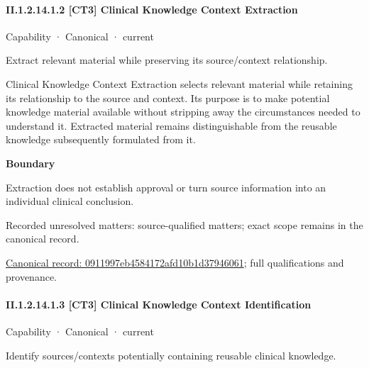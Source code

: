 \paragraph*{II.1.2.14.1.2 [CT3] Clinical Knowledge Context Extraction}
\label{navigation:II.1.2.14.1.2}

\label{element:0911997eb4584172afd10b1d37946061}
{\small Capability · Canonical · current}\par

Extract relevant material while preserving its source/context relationship.



Clinical Knowledge Context Extraction selects relevant material while retaining its relationship to the source and context. Its purpose is to make potential knowledge material available without stripping away the circumstances needed to understand it. Extracted material remains distinguishable from the reusable knowledge subsequently formulated from it.



\textbf{Boundary}



Extraction does not establish approval or turn source information into an individual clinical conclusion.


{\small Recorded unresolved matters: source-qualified matters; exact scope remains in the canonical record.}\par
{\footnotesize \href{../../../../continuum/strategy/capability/0911997eb4584172afd10b1d37946061.md}{Canonical record: 0911997eb4584172afd10b1d37946061}; full qualifications and provenance.}\par
\paragraph*{II.1.2.14.1.3 [CT3] Clinical Knowledge Context Identification}
\label{navigation:II.1.2.14.1.3}

\label{element:a0facf9015514223a928e39fcbbb6bee}
{\small Capability · Canonical · current}\par

Identify sources/contexts potentially containing reusable clinical knowledge.



